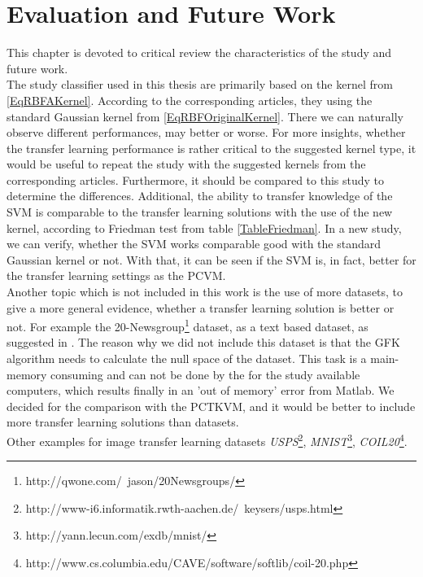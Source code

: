 \chapter{Evaluation and Future Work}\label{EvalF}	
This chapter is devoted to critical review the characteristics of the study and future work.\\
The study classifier used in this thesis are primarily based on the kernel from \eqref{EqRBFAKernel}.
According to the corresponding articles, they using the standard Gaussian kernel from \eqref{EqRBFOriginalKernel}.\cite{Long.}\cite{Gong.}\cite{Pan.2011}
There we can naturally observe different performances, may better or worse.
For more insights, whether the transfer learning performance is rather critical to the suggested kernel type, it would be useful to repeat the study with the suggested kernels from the corresponding articles.
Furthermore, it should be compared to this study to determine the differences.
Additional, the ability to transfer knowledge of the \acs{SVM} is comparable to the transfer learning solutions with the use of the new kernel, according to Friedman test from table \ref{TableFriedman}.
In a new study, we can verify, whether the \acs{SVM} works comparable good with the standard Gaussian kernel or not.
With that, it can be seen if the \acs{SVM} is, in fact, better for the transfer learning settings as the \acs{PCVM}.\\
Another topic which is not included in this work is the use of more datasets, to give a more general evidence, whether a transfer learning solution is better or not.
For example the 20-Newsgroup\footnote{http://qwone.com/~jason/20Newsgroups/} dataset, as a text based dataset, as suggested in \cite{Pan.2010}.
The reason why we did not include this dataset is that the \acs{GFK} algorithm needs to calculate the null space of the dataset.
This task is a main-memory consuming and can not be done by the for the study available computers, which results finally in an 'out of memory' error from Matlab.
We decided for the comparison with the \acs{PCTKVM}, and it would be better to include more transfer learning solutions than datasets.\\
Other examples for image transfer learning datasets \textit{USPS}\footnote{http://www-i6.informatik.rwth-aachen.de/~keysers/usps.html}, \textit{MNIST}\footnote{http://yann.lecun.com/exdb/mnist/}, \textit{COIL20}\footnote{http://www.cs.columbia.edu/CAVE/software/softlib/coil-20.php}.\cite{Long.}\cite{Long.2014}
